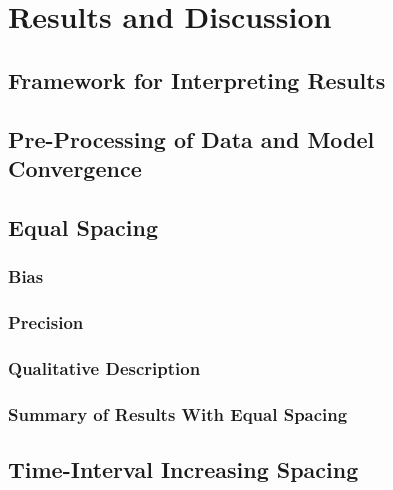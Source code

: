 \documentclass[
12pt, %
twoside,
english]{guelphthesis}
\begin{document}
\hypertarget{results-and-discussion-1}{%
\section{Results and Discussion}\label{results-and-discussion-1}}

\hypertarget{framework-for-interpreting-results-1}{%
\subsection{Framework for Interpreting Results}\label{framework-for-interpreting-results-1}}

\hypertarget{pre-processing-of-data-and-model-convergence-1}{%
\subsection{Pre-Processing of Data and Model Convergence}\label{pre-processing-of-data-and-model-convergence-1}}

\hypertarget{concise-example}{%
\subsection{Equal Spacing}\label{concise-example}}

\hypertarget{bias-equal-exp2}{%
\subsubsection{Bias}\label{bias-equal-exp2}}

\hypertarget{precision-equal-exp2}{%
\subsubsection{Precision}\label{precision-equal-exp2}}

\hypertarget{qualitative-equal-exp2}{%
\subsubsection{Qualitative Description}\label{qualitative-equal-exp2}}

\hypertarget{summary-of-results-with-equal-spacing-1}{%
\subsubsection{Summary of Results With Equal Spacing}\label{summary-of-results-with-equal-spacing-1}}

\hypertarget{time-interval-increasing-spacing-1}{%
\subsection{Time-Interval Increasing Spacing}\label{time-interval-increasing-spacing-1}}
\end{document}
